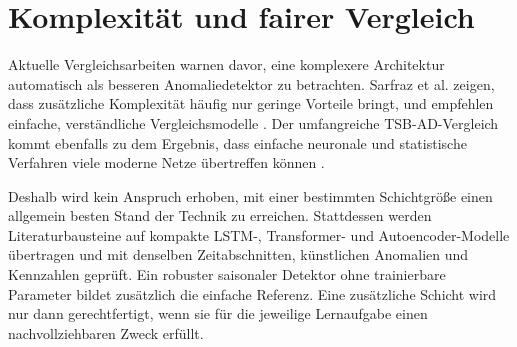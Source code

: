 \section[Fairer Vergleich]{Komplexität und fairer Vergleich}

Aktuelle Vergleichsarbeiten warnen davor, eine komplexere Architektur
automatisch als besseren Anomaliedetektor zu betrachten. Sarfraz et al. zeigen,
dass zusätzliche Komplexität häufig nur geringe Vorteile bringt, und empfehlen
einfache, verständliche Vergleichsmodelle \cite{sarfraz2024quovadis}. Der
umfangreiche TSB-AD-Vergleich kommt ebenfalls zu dem Ergebnis, dass einfache
neuronale und statistische Verfahren viele moderne Netze übertreffen können
\cite{liu2024elephant}.

Deshalb wird kein Anspruch erhoben, mit einer bestimmten Schichtgröße einen
allgemein besten Stand der Technik zu erreichen. Stattdessen werden
Literaturbausteine auf kompakte LSTM-, Transformer- und Autoencoder-Modelle
übertragen und mit denselben Zeitabschnitten, künstlichen Anomalien und
Kennzahlen geprüft. Ein robuster saisonaler Detektor ohne trainierbare
Parameter bildet zusätzlich die einfache Referenz. Eine zusätzliche Schicht
wird nur dann gerechtfertigt, wenn sie für die jeweilige Lernaufgabe einen
nachvollziehbaren Zweck erfüllt.
